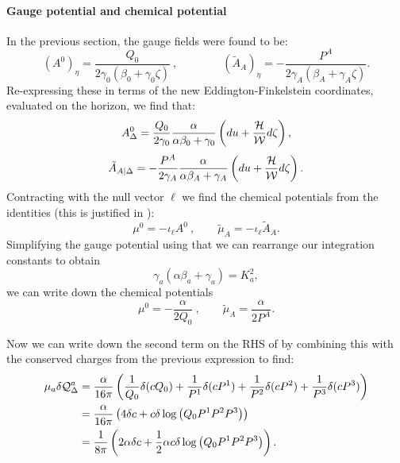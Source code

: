 \paragraph{Gauge potential and chemical potential}
In the previous section, the gauge fields were found to be:
\begin{equation*}
(A^{0})_\eta = \frac{Q_0}{2\gamma_0(\beta_0 + \gamma_0 \zeta)}
\ , \qquad \qquad     (\tilde{A}_A)_\eta = -\frac{P^A}{2\gamma_A (\beta_A + \gamma_A \zeta)}.
\end{equation*}
Re-expressing these in terms of the new Eddington-Finkelstein coordinates, evaluated on the horizon, we find that:
\begin{equation*}
    A^0_\Delta = \frac{Q_0}{2\gamma_0} \frac{\alpha}{\alpha \beta_0 + \gamma_0} \left(du + \frac{{\cal H}}{{\cal W}} d\zeta \right),
\end{equation*}
\begin{equation*}
    \tilde{A}_{A|\Delta} = -\frac{P^A}{2\gamma_A} \frac{\alpha}{\alpha \beta_A + \gamma_A} \left(du + \frac{{\cal H}}{{\cal W}} d\zeta \right).
\end{equation*}
Contracting with the null vector $\ell$ we find the chemical potentials from the identities (this is justified in \cite{Ashtekar:2000hw}):
\begin{equation*}
    \mu^0 = -\iota_\ell A^0 \ , \qquad \tilde{\mu}_A = - \iota_\ell \tilde{A}_A .
\end{equation*}
Simplifying the gauge potential using that we can rearrange our integration constants to obtain
\begin{equation*}
\gamma_a (\alpha \beta_a + \gamma_a) = K_a^2   , 
\end{equation*}
we can write down the chemical potentials
\begin{equation*}
    \mu^0 = - \frac{\alpha}{2 Q_0} \ , \qquad \tilde{\mu}_A =  \frac{\alpha}{2 P^A}.
\end{equation*}

Now we can write down the second term on the RHS of  by combining this with the conserved charges from the previous expression to find:
\begin{equation*}
\begin{aligned}
        \mu_a \delta \mathcal{Q}^a_\Delta &= \frac{\alpha}{16 \pi} \left(\frac{1}{Q_0} \delta( c Q_0) + \frac{1}{P^1} \delta( c P^1) + \frac{1}{P^2} \delta( c P^2) + \frac{1}{P^3} \delta( c P^3) \right) \\
        &= \frac{\alpha }{16 \pi} \left( 4 \delta c  + c \delta \log \left(Q_0 P^1 P^2 P^3 \right) \right) \\
        &= \frac{1}{8\pi} \left( 2 \alpha  \delta c + \frac{1}{2} \alpha  c \delta \log \left(Q_0 P^1 P^2 P^3 \right) \right).
\end{aligned}
\end{equation*}

